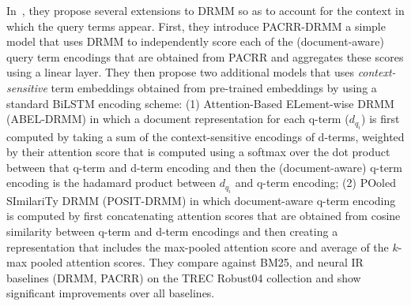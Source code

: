 In~\cite{pacrr_drmm_18}, they propose several extensions to DRMM so as to account for the context in which the query terms appear. First, they introduce PACRR-DRMM a simple model that uses DRMM to independently score each of the (document-aware) query term encodings that are obtained from PACRR and aggregates these scores using a linear layer. They then propose two additional models that uses \textit{context-sensitive} term embeddings obtained from pre-trained embeddings by using a standard BiLSTM encoding scheme: (1) \textsf{Attention-Based ELement-wise} DRMM (ABEL-DRMM) in which a document representation for each q-term ($d_{q_i}$) is first computed by taking a sum of the context-sensitive encodings of d-terms, weighted by their attention score that is computed using a softmax over the dot product between that q-term and d-term encoding and then the (document-aware) q-term encoding is the hadamard product between $d_{q_i}$ and q-term encoding; (2) \textsf{POoled SImilariTy DRMM} (POSIT-DRMM) in which document-aware q-term encoding is computed by first concatenating attention scores that are obtained from cosine similarity between q-term and d-term encodings and then creating a representation that includes the max-pooled attention score and average of the $k$-max pooled attention scores. They compare against BM25, and neural IR baselines (DRMM, PACRR) on the TREC Robust04 collection and show significant improvements over all baselines.

